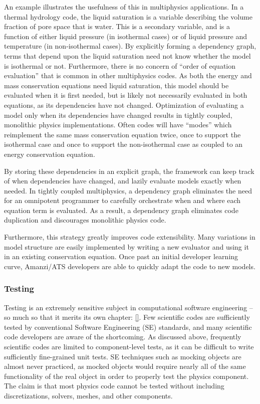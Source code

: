 An example illustrates the usefulness of this in multiphysics applications.
In a thermal hydrology code, the liquid saturation is a variable describing the volume fraction of pore space that is water.
This is a secondary variable, and is a function of either liquid pressure (in isothermal cases) or of liquid pressure and temperature (in non-isothermal cases).
By explicitly forming a dependency graph, terms that depend upon the liquid saturation need not know whether the model is isothermal or not.
Furthermore, there is no concern of ``order of equation evaluation'' that is common in other multiphysics codes.
As both the energy and mass conservation equations need liquid saturation, this model should be evaluated when it is first needed, but is likely not necessarily evaluated in both equations, as its dependencies have not changed.
Optimization of evaluating a model only when its dependencies have changed results in tightly coupled, monolithic physics implementations.
Often codes will have ``modes'' which reimplement the same mass conservation equation twice, once to support the isothermal case and once to support the non-isothermal case as coupled to an energy conservation equation.

By storing these dependencies in an explicit graph, the framework can keep track of when dependencies have changed, and lazily evaluate models exactly when needed.
In tightly coupled multiphysics, a dependency graph eliminates the need for an omnipotent programmer to carefully orchestrate when and where each equation term is evaluated.
As a result, a dependency graph eliminates code duplication and discourages monolithic physics code.

Furthermore, this strategy greatly improves code extensibility.
Many variations in model structure are easily implemented by writing a new evaluator and using it in an existing conservation equation.
Once past an initial developer learning curve, Amanzi/ATS developers are able to quickly adapt the code to new models.

\subsubsection{Testing}
\label{sec:amanzi:testing}
%
Testing is an extremely sensitive subject in computational software engineering -- so much so that it merits its own chapter: \ref{}.
Few scientific codes are sufficiently tested by conventional Software Engineering (SE) standards, and many scientific code developers are aware of the shortcoming.
As discussed above, frequently scientific codes are limited to component-level tests, as it can be difficult to write sufficiently fine-grained unit tests.
SE techniques such as mocking objects are almost never practiced, as mocked objects would require nearly all of the same functionality of the real object in order to properly test the physics component.
The claim is that most physics code cannot be tested without including discretizations, solvers, meshes, and other components.

